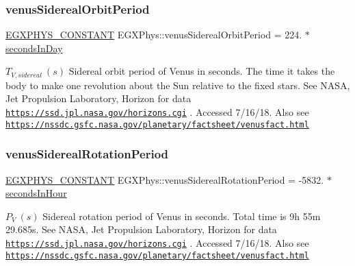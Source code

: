 \subsubsection{\texorpdfstring{venus\+Sidereal\+Orbit\+Period}{venusSiderealOrbitPeriod}}
{\footnotesize\ttfamily \mbox{\hyperlink{group___e_g_x_phys-_constants-_macros_ga76980d288494ce1714c9ac68a95ba702}{E\+G\+X\+P\+H\+Y\+S\+\_\+\+C\+O\+N\+S\+T\+A\+NT}} E\+G\+X\+Phys\+::venus\+Sidereal\+Orbit\+Period = 224. $\ast$ \mbox{\hyperlink{namespace_e_g_x_phys_a93d2a00d75411b58cbf63ab3fd1f8bc2}{seconds\+In\+Day}}}

$ T_{V,sidereal} \ (s)$ Sidereal orbit period of Venus in seconds. The time it takes the body to make one revolution about the Sun relative to the fixed stars. See N\+A\+SA, Jet Propulsion Laboratory, Horizon for data \href{https://ssd.jpl.nasa.gov/horizons.cgi}{\tt https\+://ssd.\+jpl.\+nasa.\+gov/horizons.\+cgi} . Accessed 7/16/18. Also see \href{https://nssdc.gsfc.nasa.gov/planetary/factsheet/venusfact.html}{\tt https\+://nssdc.\+gsfc.\+nasa.\+gov/planetary/factsheet/venusfact.\+html} \mbox{\label{group___e_g_x_phys-_constants-_astrophysics-_solar_system-_venus-_orbit_ga4e94bf7176747a4bcb1c29f3fcb0aa04}} 
\subsubsection{\texorpdfstring{venus\+Sidereal\+Rotation\+Period}{venusSiderealRotationPeriod}}
{\footnotesize\ttfamily \mbox{\hyperlink{group___e_g_x_phys-_constants-_macros_ga76980d288494ce1714c9ac68a95ba702}{E\+G\+X\+P\+H\+Y\+S\+\_\+\+C\+O\+N\+S\+T\+A\+NT}} E\+G\+X\+Phys\+::venus\+Sidereal\+Rotation\+Period = -\/5832. $\ast$ \mbox{\hyperlink{namespace_e_g_x_phys_a7c3165cd93e36f1fb8e9fef80f117bef}{seconds\+In\+Hour}}}

$ P_{V} \ (s)$ Sidereal rotation period of Venus in seconds. Total time is 9h 55m 29.\+685s. See N\+A\+SA, Jet Propulsion Laboratory, Horizon for data \href{https://ssd.jpl.nasa.gov/horizons.cgi}{\tt https\+://ssd.\+jpl.\+nasa.\+gov/horizons.\+cgi} . Accessed 7/16/18. Also see \href{https://nssdc.gsfc.nasa.gov/planetary/factsheet/venusfact.html}{\tt https\+://nssdc.\+gsfc.\+nasa.\+gov/planetary/factsheet/venusfact.\+html} \mbox{\label{group___e_g_x_phys-_constants-_astrophysics-_solar_system-_venus-_orbit_gafec48d2c348296d02e7ada88c20edac6}} 
